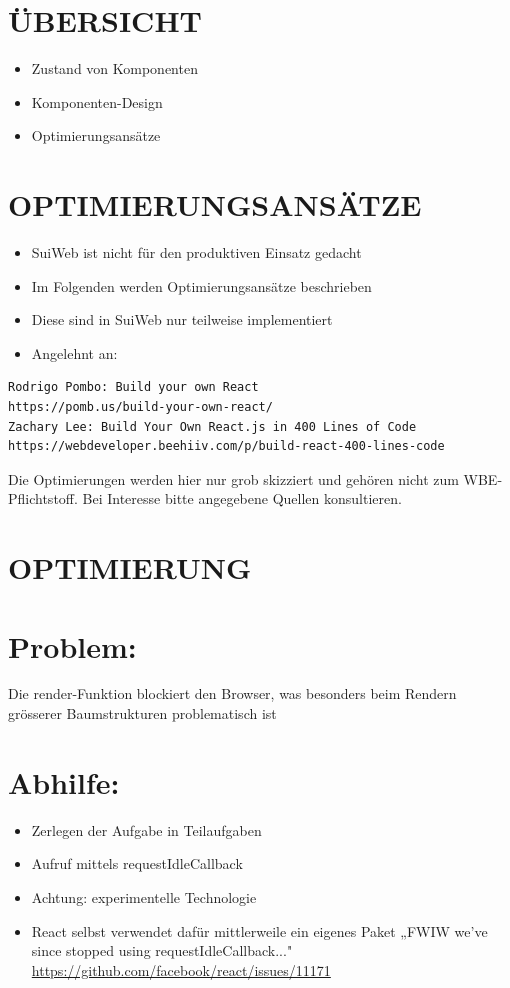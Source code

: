 \section*{ÜBERSICHT}
\begin{itemize}
  \item Zustand von Komponenten
  \item Komponenten-Design
  \item Optimierungsansätze
\end{itemize}

\section*{OPTIMIERUNGSANSÄTZE}
\begin{itemize}
  \item SuiWeb ist nicht für den produktiven Einsatz gedacht
  \item Im Folgenden werden Optimierungsansätze beschrieben
  \item Diese sind in SuiWeb nur teilweise implementiert
  \item Angelehnt an:
\end{itemize}

\begin{verbatim}
Rodrigo Pombo: Build your own React
https://pomb.us/build-your-own-react/
Zachary Lee: Build Your Own React.js in 400 Lines of Code
https://webdeveloper.beehiiv.com/p/build-react-400-lines-code
\end{verbatim}

Die Optimierungen werden hier nur grob skizziert und gehören nicht zum WBE-Pflichtstoff. Bei Interesse bitte angegebene Quellen konsultieren.

\section*{OPTIMIERUNG}
\section*{Problem:}
Die render-Funktion blockiert den Browser, was besonders beim Rendern grösserer Baumstrukturen problematisch ist

\section*{Abhilfe:}
\begin{itemize}
  \item Zerlegen der Aufgabe in Teilaufgaben
  \item Aufruf mittels requestIdleCallback
  \item Achtung: experimentelle Technologie
  \item React selbst verwendet dafür mittlerweile ein eigenes Paket „FWIW we've since stopped using requestIdleCallback..." \href{https://github.com/facebook/react/issues/11171}{https://github.com/facebook/react/issues/11171}
\end{itemize}

